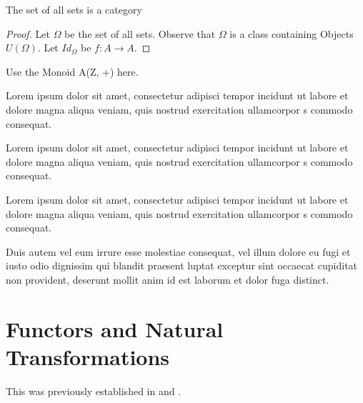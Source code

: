 \documentclass{article}
\begin{document}
\begin{theorem}
  The set of all sets is a category
\end{theorem}

\begin{proof}
Let $\Omega$ be the set of all sets. Observe that $\Omega$ is a class containing Objects $U(\Omega)$. Let $Id_{\Omega}$ be $f: A \to A$.
\end{proof}

\begin{example}
Use the Monoid A(Z, +) here.
\end{example}

Lorem ipsum dolor sit amet, consectetur adipisci tempor incidunt ut labore et dolore magna aliqua veniam, quis nostrud exercitation ullamcorpor s commodo consequat. 

\begin{definition}\label{def:lorem}
	Lorem ipsum dolor sit amet, consectetur adipisci tempor incidunt ut labore et dolore magna aliqua veniam, quis nostrud exercitation ullamcorpor s commodo consequat.
\end{definition}

Lorem ipsum dolor sit amet, consectetur adipisci tempor incidunt ut labore et dolore magna aliqua veniam, quis nostrud exercitation ullamcorpor s commodo consequat. 

\begin{theorem}\label{thm:ipsum}
	Duis autem vel eum irrure esse molestiae consequat, vel illum dolore eu fugi et iusto odio dignissim qui blandit praesent luptat exceptur sint occaecat cupiditat non provident, deserunt mollit anim id est laborum et dolor fuga distinct.
\end{theorem}



\section{Functors and Natural Transformations}

This was previously established in \cite{Gauss86} and \cite{Euclid02,Euclid03}.




\end{document}

